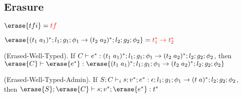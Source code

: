\subsection{Erasure}

\begin{definition}{$\erase{tfi} = \textcolor{red}{tf}$}
    
    $\erase{\ti{t_1}{a_1}^{*};l_1;g_1;\phi_1 \rightarrow \ti{t_2}{a_2}^{*};l_2;g_2;\phi_2} = \textcolor{red}{t_1^{*} \rightarrow t_2^{*}}$

\end{definition}

\begin{lemma}{(Erased-Well-Typed).}
    If $C \vdash e^{*} : (t_1\;a_1)^{*};l_1;g_1;\phi_1 \rightarrow (t_2\;a_2)^{*};l_2;g_2;\phi_2$, then $\erase{C} \vdash \erase{e^{*}} : \erase{\ti{t_1}{a_1}^{*};l_1;g_1;\phi_1 \rightarrow \ti{t_2}{a_2}^{*};l_2;g_2;\phi_2}$
\end{lemma}

\begin{lemma}{(Erased-Well-Typed-Admin).}
    If $S;C \vdash_i s;v^{*};e^{*} : \epsilon;l_1;g_1;\phi_1 \rightarrow (t\;a)^{*};l_2;g_2;\phi_2$, then $\erase{S};\erase{C} \vdash s;v^{*};\erase{e^{*}} : t^{*}$
\end{lemma}